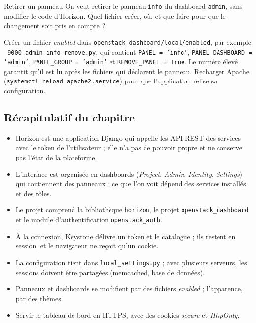 \begin{exercice}{Retirer un panneau}\label{ex:ho-panneau}
On veut retirer le panneau \texttt{info} du dashboard \texttt{admin}, sans modifier le code d'Horizon. Quel fichier créer, où,
et que faire pour que le changement soit pris en compte ?
\end{exercice}
\begin{correction}
Créer un fichier \emph{enabled} dans \texttt{openstack\_\allowbreak dashboard/local/enabled}, par exemple
\texttt{\_9000\_\allowbreak admin\_\allowbreak info\_\allowbreak remove.py}, qui contient \texttt{PANEL = 'info'}, \texttt{PANEL\_\allowbreak DASHBOARD = 'admin'},
\texttt{PANEL\_\allowbreak GROUP = 'admin'} et \texttt{REMOVE\_\allowbreak PANEL = True}. Le numéro élevé garantit qu'il est lu après les fichiers qui
déclarent le panneau. Recharger Apache (\texttt{systemctl reload apache2.service}) pour que l'application relise sa configuration.
\end{correction}

\subsection{Récapitulatif du chapitre}\label{sec:ho-recap}

\begin{aretenir}
\begin{itemize}
  \item Horizon est une application Django qui appelle les API REST des services avec le token de l'utilisateur ; elle n'a
        pas de pouvoir propre et ne conserve pas l'état de la plateforme.
  \item L'interface est organisée en dashboards (\emph{Project}, \emph{Admin}, \emph{Identity}, \emph{Settings}) qui contiennent
        des panneaux ; ce que l'on voit dépend des services installés et des rôles.
  \item Le projet comprend la bibliothèque \texttt{horizon}, le projet \texttt{openstack\_\allowbreak dashboard} et le module
        d'authentification \texttt{openstack\_\allowbreak auth}.
  \item À la connexion, Keystone délivre un token et le catalogue ; ils restent en session, et le navigateur ne reçoit qu'un
        cookie.
  \item La configuration tient dans \texttt{local\_\allowbreak settings.py} ; avec plusieurs serveurs, les sessions doivent être
        partagées (memcached, base de données).
  \item Panneaux et dashboards se modifient par des fichiers \emph{enabled} ; l'apparence, par des thèmes.
  \item Servir le tableau de bord en HTTPS, avec des cookies \emph{secure} et \emph{HttpOnly}.
\end{itemize}
\end{aretenir}

